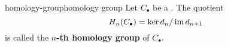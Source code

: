 

    

\begin{topic}{homology-group}{homology group}
    Let $C_\bullet$ be a . The quotient
    \[ H_n(C_\bullet) = \ker d_n / \operatorname{im} d_{n + 1} \]
    is called the \textbf{$n$-th homology group} of $C_\bullet$.
\end{topic}

